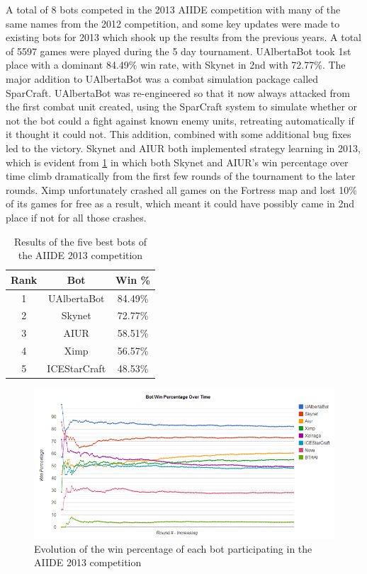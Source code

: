 \documentclass{llncs}
\begin{document}
A total of 8 bots competed in the 2013 AIIDE competition with many of the same names from the 2012 competition, and some key updates were made to existing bots for 2013 which shook up the results from the previous years. A total of 5597 games were played during the 5 day tournament. UAlbertaBot took 1st place with a dominant 84.49\% win rate, with Skynet in 2nd with 72.77\%. The major addition to UAlbertaBot was a combat simulation package called SparCraft. UAlbertaBot was re-engineered so that it now always attacked from the first combat unit created, using the SparCraft system to simulate whether or not the bot could a fight against known enemy units, retreating automatically if it thought it could not. This addition, combined with some additional bug fixes led to the victory. Skynet and AIUR both implemented strategy learning in 2013, which is evident from \ref{fig:aiide2013} in which both Skynet and AIUR's win percentage over time climb dramatically from the first few rounds of the tournament to the later rounds. Ximp unfortunately crashed all games on the Fortress map and lost 10\% of its games for free as a result, which meant it could have possibly came in 2nd place if not for all those crashes. 

\begin{table}[!t]
\caption{Results of the five best bots of the AIIDE 2013 competition}
\label{tab:aiide2013}
\centering
\begin{tabular}{|c|c|c|}
\hline
{\bfseries Rank} & {\bfseries Bot} & {\bfseries Win \%} \\
\hline
1 & UAlbertaBot & 84.49\% \\
2 & Skynet & 72.77\% \\
3 & AIUR & 58.51\% \\
4 & Ximp & 56.57\% \\
5 & ICEStarCraft & 48.53\% \\
\hline
\end{tabular}
\end{table}

\begin{figure}[t!]
    \centering
    \includegraphics[width=\columnwidth]{figures/aiide2013}
    \caption{Evolution of the win percentage of each bot participating in the AIIDE 2013 competition}
    \label{fig:aiide2013}
\end{figure}
\end{document}
